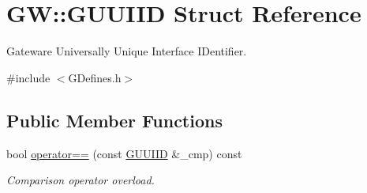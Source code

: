\hypertarget{structGW_1_1GUUIID}{}\section{GW\+:\+:G\+U\+U\+I\+ID Struct Reference}
\label{structGW_1_1GUUIID}


Gateware Universally Unique Interface I\+Dentifier.  




{\ttfamily \#include $<$G\+Defines.\+h$>$}

\subsection*{Public Member Functions}
\begin{DoxyCompactItemize}
\item 
bool \hyperlink{structGW_1_1GUUIID_a84e8d2cc912c79229af8dd9a898e1ace}{operator==} (const \hyperlink{structGW_1_1GUUIID}{G\+U\+U\+I\+ID} \&\+\_\+cmp) const \hypertarget{structGW_1_1GUUIID_a84e8d2cc912c79229af8dd9a898e1ace}{}\label{structGW_1_1GUUIID_a84e8d2cc912c79229af8dd9a898e1ace}

\begin{DoxyCompactList}\small\item\em Comparison operator overload. \end{DoxyCompactList}\end{DoxyCompactItemize}
